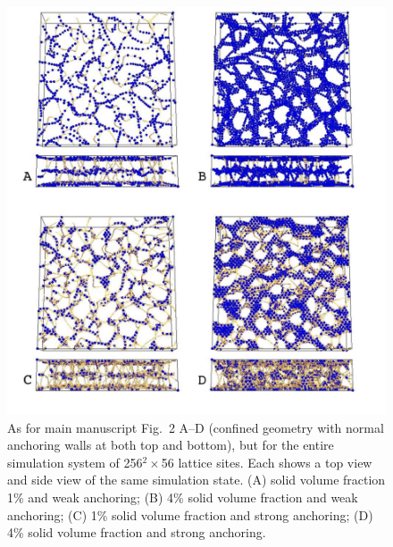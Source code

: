 \documentclass[12pt,twoside]{article}
\begin{document}
\begin{figure}[!h]
\begin{center}
\includegraphics[scale=0.42]{support-fig5.pdf}
\end{center}
\caption{As for main manuscript Fig.~2 A--D (confined geometry with normal
anchoring walls at both top and bottom), but for the entire simulation
system of 256$^2\times$56 lattice sites. Each shows a top view and
side view of the same simulation state. (A) solid volume fraction 1\%
and weak anchoring; (B) 4\% solid volume fraction and weak anchoring;
(C) 1\% solid volume fraction and strong anchoring; (D) 4\% solid
volume fraction and strong anchoring.}
\end{figure}

\newpage
\end{document}
